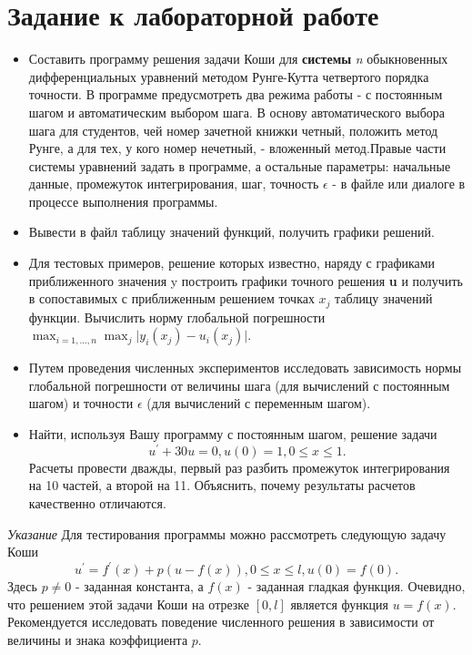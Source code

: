 \documentclass[a4paper,12pt]{article}
\begin{document}


\section{\normalsize{Задание к лабораторной работе}}
\begin{flushleft}
    \begin{itemize}
        \item Составить программу решения задачи Коши для \textbf{системы} \textit{n} обыкновенных дифференциальных уравнений методом Рунге-Кутта четвертого порядка точности. В программе предусмотреть два режима работы - с постоянным шагом и автоматическим выбором шага. В основу автоматического выбора шага для студентов, чей номер зачетной книжки четный, положить метод Рунге, а для тех, у кого номер нечетный, - вложенный метод.\linebreak[2]Правые части системы уравнений задать в программе, а остальные параметры: начальные данные, промежуток интегрирования, шаг, точность \(\epsilon\) - в файле или диалоге в процессе выполнения программы.
        \item Вывести в файл таблицу значений функций, получить графики решений.
        \item Для тестовых примеров, решение которых известно, наряду с графиками приближенного значения y построить графики точного решения \textbf{u} и получить в сопоставимых с приближенным решением точках \(x_j\) таблицу значений функции. Вычислить норму глобальной погрешности \(\displaystyle\max_{i=1,...,n}\max_j\mathopen|y_i(x_j)-u_i(x_j)\mathclose|\).
        \item Путем проведения численных экспериментов исследовать зависимость нормы глобальной погрешности от величины шага (для вычислений с постоянным шагом) и точности \(\epsilon\) (для вычислений с переменным шагом).
        \item Найти, используя Вашу программу с постоянным шагом, решение задачи\linebreak\[u^{'} + 30u = 0, u(0) = 1, 0 \le x \le 1.\]\linebreak Расчеты провести дважды, первый раз разбить промежуток интегрирования на 10 частей, а второй на 11. Объяснить, почему результаты расчетов качественно отличаются.
    \end{itemize}
\end{flushleft}
\begin{flushleft}
    \textit{Указание} Для тестирования программы можно рассмотреть следующую задачу Коши\linebreak \[u^{'}=f^{'}(x)+p(u-f(x)), 0 \le x \le l, u(0) = f(0).\]\linebreak Здесь \(p \ne 0\) - заданная константа, а \(f(x)\) - заданная гладкая функция. Очевидно, что решением этой задачи Коши на отрезке \([0,l]\) является функция \(u=f(x)\). Рекомендуется исследовать поведение численного решения в зависимости от величины и знака коэффициента \(p\).
\end{flushleft}
\end{document}
